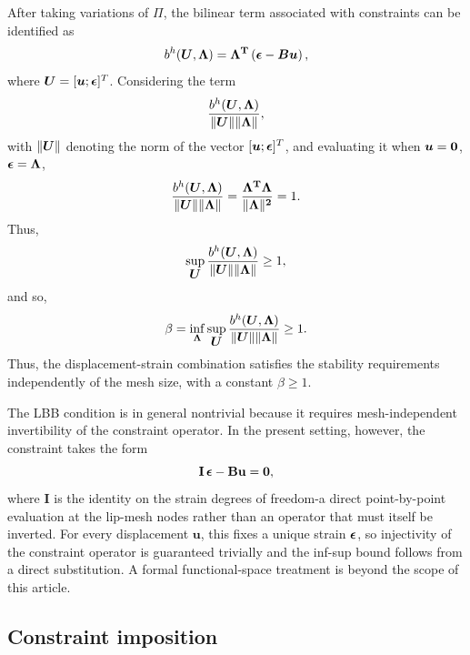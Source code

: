 \documentclass[10pt]{cas-sc}
\newenvironment{addedblock}
{\begingroup\color{blue!80}}
{\endgroup}
\begin{document}
\begin{addedblock}
After taking variations of $\Pi$, the bilinear term associated with constraints can be identified as
\begin{equation}
	b^h(\mbox{\boldmath $U$},\bf \Lambda) = \bf \Lambda ^T \left(\mbox{\boldmath $\epsilon$} - \mbox{\boldmath $B$} \mbox{\boldmath $u$} \right),
\end{equation}
where $\mbox{\boldmath $U$} = [\mbox{\boldmath $u$} ; \mbox{\boldmath $\epsilon$} ]^T$. Considering the term 
\[    \frac{ b^h(\mbox{\boldmath $U$},\bf \Lambda)}{\|\mbox{\boldmath $U$} \| \| \bf \Lambda\|} , \]
with $ \|\mbox{\boldmath $U$} \|$ denoting the norm of the vector $[\mbox{\boldmath $u$} ; \mbox{\boldmath $\epsilon$} ]^T$, and evaluating it when $\mbox{\boldmath $u$} = \bf 0$, $\mbox{\boldmath $\epsilon$} = \bf \Lambda$,
\begin{equation}
	\frac{ b^h(\mbox{\boldmath $U$},\bf \Lambda)}{\|\mbox{\boldmath $U$} \| \| \bf \Lambda\|} =  \frac{\bf \Lambda ^T \bf \Lambda }{\| \bf \Lambda\|^2} = 1.
\end{equation}
Thus,
\begin{equation}
	\sup _{\mbox{\boldmath $U$}} \frac{ b^h(\mbox{\boldmath $U$},\bf \Lambda)}{\|\mbox{\boldmath $U$} \| \| \bf \Lambda\|}  \geq 1,
\end{equation}
and so,
\begin{equation}
	\beta = \inf_{\bf \Lambda} \sup _{\mbox{\boldmath $U$}} 	\frac{ b^h(\mbox{\boldmath $U$},\bf \Lambda)}{\|\mbox{\boldmath $U$} \| \| \bf \Lambda\|}  \geq 1.
\end{equation}
Thus, the displacement-strain combination satisfies the stability requirements independently of the mesh size, with a constant $\beta \geq 1$. 

The LBB condition is in general nontrivial because it requires mesh-independent invertibility of the constraint operator. In the present setting, however, the constraint takes the form
\begin{equation*}
	\mathbf{I}\,\mbox{\boldmath $\epsilon$} - \mathbf{B}\mathbf{u} = \mathbf{0},
\end{equation*}
where $\mathbf{I}$ is the identity on the strain degrees of freedom-a direct point-by-point evaluation at the lip-mesh nodes rather than an operator that must itself be inverted. For every displacement $\mathbf{u}$, this fixes a unique strain $\mbox{\boldmath $\epsilon$}$, so injectivity of the constraint operator is guaranteed trivially and the inf-sup bound follows from a direct substitution. A formal functional-space treatment is beyond the scope of this article.

\end{addedblock}
\subsection{Constraint imposition}
\end{document}
